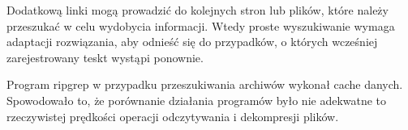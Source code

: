 Dodatkową linki mogą prowadzić do kolejnych stron lub plików, które należy przeszukać w celu wydobycia informacji.
Wtedy proste wyszukiwanie wymaga adaptacji rozwiązania, aby odnieść się do 
przypadków, o których wcześniej zarejestrowany teskt wystąpi ponownie.

Program ripgrep w przypadku przeszukiwania archiwów wykonał cache danych.
Spowodowało to, że porównanie działania programów było nie adekwatne to 
rzeczywistej prędkości operacji odczytywania i dekompresji plików.
